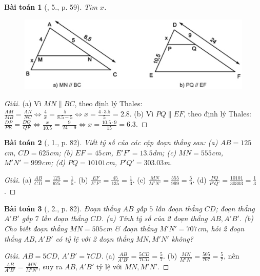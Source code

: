 \documentclass{article}
\newtheorem{baitoan}{Bài toán}
\begin{document}
\begin{baitoan}[\cite{SGK_Toan_8_tap_2}, 5., p. 59]
	Tìm $x$.
	\begin{figure}[H]
		\centering
		\includegraphics[scale=0.2]{SGK_Toan_8_7}
	\end{figure}
\end{baitoan}

\begin{proof}[Giải]
	(a) Vì $MN\parallel BC$, theo định lý Thales: $\frac{AM}{MB} = \frac{AN}{NC}\Leftrightarrow\frac{4}{x} = \frac{5}{8.5 - 5}\Leftrightarrow x = \frac{4\cdot3.5}{5} = 2.8$. (b) Vì $PQ\parallel EF$, theo định lý Thales: $\frac{DP}{PE} = \frac{DQ}{QF}\Leftrightarrow\frac{x}{10.5} = \frac{9}{24 - 9}\Leftrightarrow x = \frac{10.5\cdot9}{15} = 6.3$.
\end{proof}

\begin{baitoan}[\cite{SBT_Toan_8_tap_2}, 1., p. 82]
	Viết tỷ số của các cặp đoạn thẳng sau: (a) $AB = 125$\emph{cm}, $CD = 625$\emph{cm}; (b) $EF = 45$\emph{cm}, $E'F' = 13.5$\emph{dm}; (c) $MN = 555$\emph{cm}, $M'N' = 999$\emph{cm}; (d) $PQ = 10101$\emph{cm}, $P'Q' = 303.03$\emph{m}.	
\end{baitoan}

\begin{proof}[Giải]
	(a) $\frac{AB}{CD} = \frac{125}{625} = \frac{1}{5}$. (b) $\frac{EF}{E'F'} = \frac{45}{135} = \frac{1}{3}$. (c) $\frac{MN}{M'N'} = \frac{555}{999} = \frac{5}{9}$. (d) $\frac{PQ}{P'Q'} = \frac{10101}{30303} = \frac{1}{3}$.
\end{proof}

\begin{baitoan}[\cite{SBT_Toan_8_tap_2}, 2., p. 82]
	Đoạn thẳng $AB$ gấp $5$ lần đoạn thẳng $CD$; đoạn thẳng $A'B'$ gấp $7$ lần đoạn thẳng $CD$. (a) Tính tỷ số của 2 đoạn thẳng $AB,A'B'$. (b) Cho biết đoạn thẳng $MN = 505$\emph{cm} \& đoạn thẳng $M'N' = 707$\emph{cm}, hỏi 2 đoạn thẳng $AB,A'B'$ có tỷ lệ với 2 đoạn thẳng $MN,M'N'$ không?
\end{baitoan}

\begin{proof}[Giải]
	$AB = 5CD$, $A'B' = 7CD$. (a) $\frac{AB}{A'B'} = \frac{5CD}{7CD} = \frac{5}{7}$. (b) $\frac{MN}{M'N'} = \frac{505}{707} = \frac{5}{7}$, nên $\frac{AB}{A'B'} = \frac{MN}{M'N'}$, suy ra $AB,A'B'$ tỷ lệ với $MN,M'N'$.
\end{proof}
\end{document}

